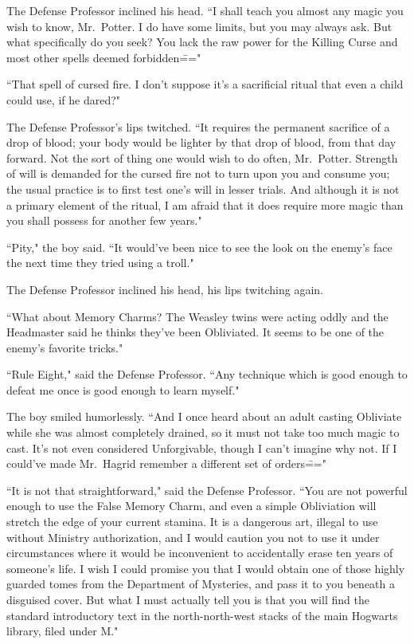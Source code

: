The Defense Professor inclined his head. ``I shall teach you almost any magic you wish to know, Mr.~Potter. I do have some limits, but you may always ask. But what specifically do you seek? You lack the raw power for the Killing Curse and most other spells deemed forbidden\==="

``That spell of cursed fire. I don't suppose it's a sacrificial ritual that even a child could use, if he dared?"

The Defense Professor's lips twitched. ``It requires the permanent sacrifice of a drop of blood; your body would be lighter by that drop of blood, from that day forward. Not the sort of thing one would wish to do often, Mr.~Potter. Strength of will is demanded for the cursed fire not to turn upon you and consume you; the usual practice is to first test one's will in lesser trials. And although it is not a primary element of the ritual, I am afraid that it does require more magic than you shall possess for another few years."

``Pity," the boy said. ``It would've been nice to see the look on the enemy's face the next time they tried using a troll."

The Defense Professor inclined his head, his lips twitching again.

``What about Memory Charms? The Weasley twins were acting oddly and the Headmaster said he thinks they've been Obliviated. It seems to be one of the enemy's favorite tricks."

``Rule Eight," said the Defense Professor. ``Any technique which is good enough to defeat me once is good enough to learn myself."

The boy smiled humorlessly. ``And I once heard about an adult casting Obliviate while she was almost completely drained, so it must not take too much magic to cast. It's not even considered Unforgivable, though I can't imagine why not. If I could've made Mr.~Hagrid remember a different set of orders\==="

``It is not that straightforward," said the Defense Professor. ``You are not powerful enough to use the False Memory Charm, and even a simple Obliviation will stretch the edge of your current stamina. It is a dangerous art, illegal to use without Ministry authorization, and I would caution you not to use it under circumstances where it would be inconvenient to accidentally erase ten years of someone's life. I wish I could promise you that I would obtain one of those highly guarded tomes from the Department of Mysteries, and pass it to you beneath a disguised cover. But what I must actually tell you is that you will find the standard introductory text in the north-north-west stacks of the main Hogwarts library, filed under M."

